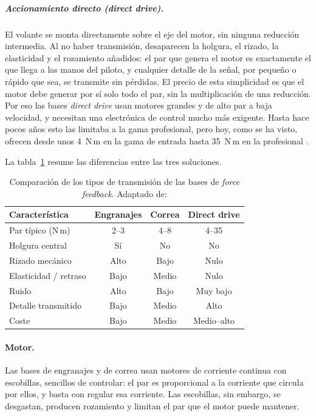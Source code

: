 \subparagraph{Accionamiento directo (\textit{direct drive}).}
El volante se monta directamente sobre el eje del motor, sin ninguna reducción intermedia. Al no haber transmisión, desaparecen la holgura, el rizado, la elasticidad y el rozamiento añadidos: el par que genera el motor es exactamente el que llega a las manos del piloto, y cualquier detalle de la señal, por pequeño o rápido que sea, se transmite sin pérdidas. El precio de esta simplicidad es que el motor debe generar por sí solo todo el par, sin la multiplicación de una reducción. Por eso las bases \textit{direct drive} usan motores grandes y de alto par a baja velocidad, y necesitan una electrónica de control mucho más exigente. Hasta hace pocos años esto las limitaba a la gama profesional, pero hoy, como se ha visto, ofrecen desde unos 4~N\,m en la gama de entrada hasta 35~N\,m en la profesional \parencite{moza_web, simucube_web}.

La tabla~\ref{tab:transmisiones} resume las diferencias entre las tres soluciones.

\begin{table}[htbp]
	\centering
	\caption[Comparación de los tipos de transmisión de las bases de \textit{force feedback}]{Comparación de los tipos de transmisión de las bases de \textit{force feedback}. Adaptado de: \parencite{logitech_g29, moza_web, simucube_web}}
	\label{tab:transmisiones}
	\small
	\begin{tabular}{|l|c|c|c|}
		\hline
		\textbf{Característica} & \textbf{Engranajes} & \textbf{Correa} & \textbf{Direct drive} \\
		\hline
		Par típico (N\,m)       & 2--3       & 4--8       & 4--35 \\
		Holgura central         & Sí         & No         & No \\
		Rizado mecánico         & Alto       & Bajo       & Nulo \\
		Elasticidad / retraso   & Bajo       & Medio      & Nulo \\
		Ruido                   & Alto       & Bajo       & Muy bajo \\
		Detalle transmitido     & Bajo       & Medio      & Alto \\
		Coste                   & Bajo       & Medio      & Medio--alto \\
		\hline
	\end{tabular}
\end{table}

\paragraph{Motor.}
Las bases de engranajes y de correa usan motores de corriente continua con escobillas, sencillos de controlar: el par es proporcional a la corriente que circula por ellos, y basta con regular esa corriente. Las escobillas, sin embargo, se desgastan, producen rozamiento y limitan el par que el motor puede mantener.

